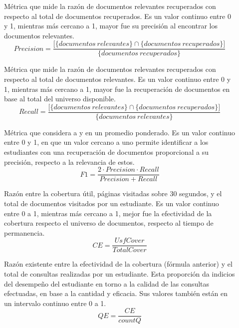 \begin{description}
	\item [] Métrica que mide la razón de documentos relevantes recuperados con 
respecto al total de documentos recuperados. Es un valor continuo entre 0 y 1, mientras más cercano a 1, mayor fue su precisión al encontrar los documentos relevantes.
	\begin{equation}
	Precision = \frac{\big[\big\{documentos \ relevantes\big\} \cap \big\{documentos \ recuperados\big\}\big]}{\big\{documentos \ recuperados\big\}}
	\end{equation}

	\item [] Métrica que mide la razón de documentos relevantes recuperados con 
respecto al total de documentos relevantes. Es un valor continuo entre 0 y 1, mientras más cercano a 1, mayor fue la recuperación de documentos en base al total del universo disponible.
	\begin{equation}
	Recall = \frac{\big[\big\{documentos \ relevantes\big\} \cap \big\{documentos \ recuperados\big\}\big]}{\big\{documentos \ relevantes\big\}}
	\end{equation}

	\item [] Métrica que considera a  y  en un promedio ponderado. Es un valor continuo entre 0 y 1, en que un valor cercano a uno permite identificar a los estudiantes con una recuperación de documentos proporcional a su precisión, respecto a la relevancia de estos.   
	\begin{equation}
	F1 = \frac{2 \cdot Precision\cdot Recall}{Precision+ Recall}
	\end{equation}
 
	\item [] Razón entre la cobertura útil, páginas visitadas sobre 30 segundos, y el total de documentos visitados por un estudiante. Es un valor continuo entre 0 a 1, mientras más cercano a 1, mejor fue la efectividad de la cobertura respecto el universo de documentos, respecto al tiempo de permanencia.     
	\begin{equation}
	CE = \frac{UsfCover}{TotalCover}
	\end{equation}

	\item [] Razón existente entre la efectividad de la cobertura (fórmula anterior) y el total de consultas realizadas por un estudiante. Esta proporción da indicios del desempeño del estudiante en torno a la calidad de las consultas efectuadas, en base a la cantidad y eficacia. Sus valores también están en un intervalo continuo entre 0 a 1.
	\begin{equation}
	QE = \frac{CE}{countQ}
	\end{equation}


\end{description}

